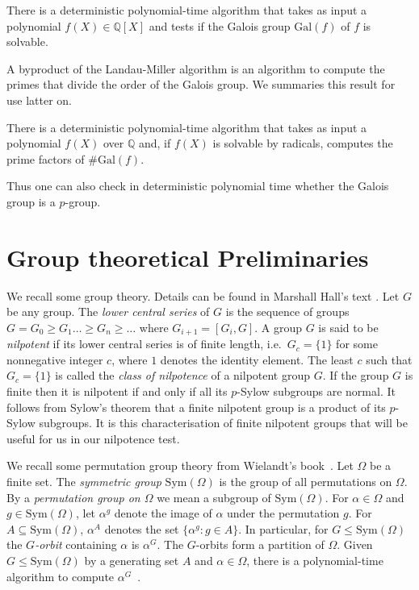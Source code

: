 \documentclass[prodmod,acmtalg]{acmsmall}
\newcommand{\Gal}[1]{{\ensuremath{\mathrm{Gal}\left(#1\right)}}}
\newcommand{\Sym}[1]{{\ensuremath{\mathrm{Sym}\left(#1\right)}}}
\newcommand{\Q}{\ensuremath{\mathbb{Q}}}
\begin{document}
\begin{theorem}\label{thm-landau-solvability}
  There is a deterministic polynomial-time algorithm that takes as
  input a polynomial $f(X) \in \Q[X]$ and tests if the Galois group
  $\Gal{f}$ of $f$ is solvable.
\end{theorem}

A byproduct of the Landau-Miller algorithm is an algorithm to compute
the primes that divide the order of the Galois group. We summaries this
result for use latter on.

\begin{theorem}\label{thm-landau-primes}
  There is a deterministic polynomial-time algorithm that takes as
  input a polynomial $f(X)$ over $\Q$ and, if $f(X)$ is solvable by
  radicals, computes the prime factors of $\# \Gal{f}$.
\end{theorem}

Thus one can also check in deterministic polynomial time whether the
Galois group is a $p$-group.

\section{Group theoretical Preliminaries}

We recall some group theory. Details can be found in Marshall Hall's
text \cite[Chapter 10]{Hall}. Let $G$ be any group. The \emph{lower
  central series} of $G$ is the sequence of groups $G = G_0 \geq G_1
\ldots \geq G_n \geq \ldots$ where $G_{i+1} = [G_i, G]$. A group $G$
is said to be \emph{nilpotent} if its lower central series is of
finite length, i.e.\ $G_c=\{1\}$ for some nonnegative integer $c$,
where $1$ denotes the identity element. The least $c$ such that
$G_c=\{1\}$ is called the \emph{class of nilpotence} of a nilpotent
group $G$. If the group $G$ is finite then it is nilpotent if and only
if all its $p$-Sylow subgroups are normal. It follows from Sylow's
theorem that a finite nilpotent group is a product of its $p$-Sylow
subgroups. It is this characterisation of finite nilpotent groups that
will be useful for us in our nilpotence test.


We recall some permutation group theory from Wielandt's
book~\cite{wielandt64finite}. Let $\Omega$ be a finite set. The
\emph{symmetric group} $\Sym{\Omega}$ is the group of all permutations
on $\Omega$.  By a \emph{permutation group on $\Omega$} we mean a
subgroup of $\Sym{\Omega}$. For $\alpha \in \Omega$ and $g \in
\Sym{\Omega}$, let $\alpha^g$ denote the image of $\alpha$ under the
permutation $g$. For $A \subseteq \Sym{\Omega}$, $\alpha^A$ denotes
the set $\{ \alpha^g : g \in A\}$. In particular, for
$G\leq\Sym{\Omega}$ the \emph{$G$-orbit} containing $\alpha$ is
$\alpha^G$. The $G$-orbits form a partition of $\Omega$.  Given
$G\leq\Sym{\Omega}$ by a generating set $A$ and $\alpha \in \Omega$,
there is a polynomial-time algorithm to compute
$\alpha^G$~\cite{luks93permutation}.
\end{document}

